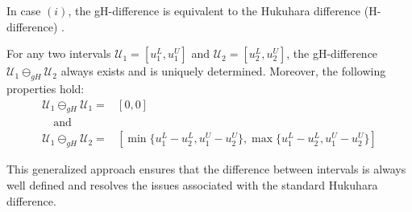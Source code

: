 \documentclass[12pt, reqno]{amsart}
\theoremstyle{definition}
\theoremstyle{remark}
\numberwithin{equation}{section}
\begin{document}
In case \((i)\), the gH-difference is equivalent to the Hukuhara difference (H-difference) \cite{Wu2007}.

 For any two intervals \( \mathcal{U}_1 = [u_1^L, u_1^U] \) and \(\mathcal{ U}_2 = [u_2^L, u_2^U] \), the gH-difference \( \mathcal{U}_1 \ominus_{gH}\mathcal{ U}_2 \) always exists and is uniquely determined. Moreover, the following properties hold:
 \begin{equation*}
     \begin{aligned}
         \mathcal{U}_1 \ominus_{gH} \mathcal{U}_1 =& [0, 0]\\ \quad \text{and} \quad \\
\mathcal{U}_1 \ominus_{gH} \mathcal{U}_2 =& \left[\min\{u_1^L - u_2^L, u_1^U - u_2^U\}, \max\{u_1^L - u_2^L, u_1^U - u_2^U\}\right]
     \end{aligned}
 \end{equation*}


This generalized approach ensures that the difference between intervals is always well defined and resolves the issues associated with the standard Hukuhara difference.




 
\end{document}
